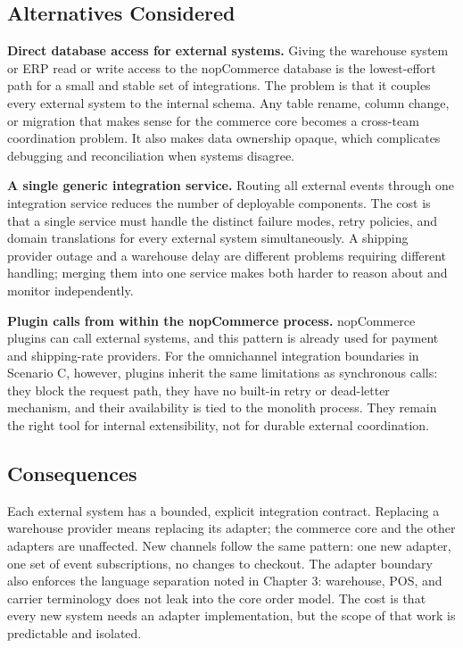 \subsection{Alternatives Considered}

\textbf{Direct database access for external systems.} Giving the warehouse system or ERP read
or write access to the nopCommerce database is the lowest-effort path for a small and stable
set of integrations. The problem is that it couples every external system to the internal
schema. Any table rename, column change, or migration that makes sense for the commerce core
becomes a cross-team coordination problem. It also makes data ownership opaque, which
complicates debugging and reconciliation when systems disagree.

\textbf{A single generic integration service.} Routing all external events through one
integration service reduces the number of deployable components. The cost is that a single
service must handle the distinct failure modes, retry policies, and domain translations for
every external system simultaneously. A shipping provider outage and a warehouse delay are
different problems requiring different handling; merging them into one service makes both
harder to reason about and monitor independently.

\textbf{Plugin calls from within the nopCommerce process.} nopCommerce plugins can call
external systems, and this pattern is already used for payment and shipping-rate providers.
For the omnichannel integration boundaries in Scenario C, however, plugins inherit the same
limitations as synchronous calls: they block the request path, they have no built-in retry or
dead-letter mechanism, and their availability is tied to the monolith process. They remain the
right tool for internal extensibility, not for durable external coordination.

\subsection{Consequences}

Each external system has a bounded, explicit integration contract. Replacing a warehouse
provider means replacing its adapter; the commerce core and the other adapters are unaffected.
New channels follow the same pattern: one new adapter, one set of event subscriptions, no
changes to checkout. The adapter boundary also enforces the language separation noted in
Chapter 3: warehouse, POS, and carrier terminology does not leak into the core order model.
The cost is that every new system needs an adapter implementation, but the scope of that work
is predictable and isolated.

